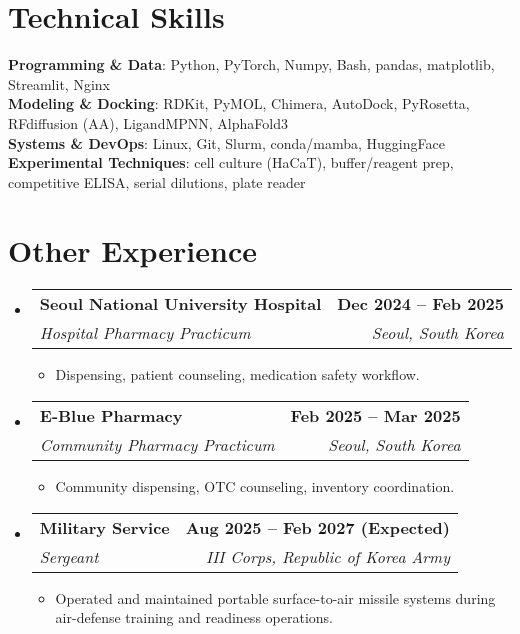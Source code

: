 \documentclass[letterpaper,11pt]{article}
\makeatletter
\newcommand{\resumeItem}[1]{
  \item\small{
    {#1 \vspace{-2pt}}
  }
}
\newcommand{\resumeSubheading}[4]{
  \vspace{-2pt}\item
    \begin{tabular*}{1.0\textwidth}[t]{l@{\extracolsep{\fill}}r}
      \textbf{#1} & \textbf{\small #2} \\
      \textit{\small#3} & \textit{\small #4} \\
    \end{tabular*}\vspace{-7pt}
}
\newcommand{\resumeSubHeadingListStart}{\begin{itemize}[leftmargin=0.0in, label={}]}
\newcommand{\resumeSubHeadingListEnd}{\end{itemize}}
\newcommand{\resumeItemListStart}{\begin{itemize}[leftmargin=0.2in]}
\newcommand{\resumeItemListEnd}{\end{itemize}\vspace{-5pt}}
\makeatother
\begin{document}
\section{Technical Skills}
 \begin{itemize}[leftmargin=0.15in, label={}]
    \small{\item{
    \textbf{Programming \& Data}: Python, PyTorch, Numpy, Bash, pandas, matplotlib, Streamlit, Nginx \\
    \textbf{Modeling \& Docking}: RDKit, PyMOL, Chimera, AutoDock, PyRosetta, RFdiffusion (AA), LigandMPNN, AlphaFold3 \\
    \textbf{Systems \& DevOps}: Linux, Git, Slurm, conda/mamba, HuggingFace \\
    \textbf{Experimental Techniques}: cell culture (HaCaT), buffer/reagent prep, competitive ELISA, serial dilutions, plate reader

    }}
 \end{itemize}
 \vspace{-16pt}


\section{Other Experience}
  \resumeSubHeadingListStart
    \resumeSubheading
      {Seoul National University Hospital}{Dec 2024 -- Feb 2025}
      {Hospital Pharmacy Practicum}{Seoul, South Korea}
      \resumeItemListStart
        \resumeItem{Dispensing, patient counseling, medication safety workflow.}
      \resumeItemListEnd
    \resumeSubheading
      {E-Blue Pharmacy}{Feb 2025 -- Mar 2025}
      {Community Pharmacy Practicum}{Seoul, South Korea}
      \resumeItemListStart
        \resumeItem{Community dispensing, OTC counseling, inventory coordination.}
      \resumeItemListEnd
    \resumeSubheading
      {Military Service}{Aug 2025 -- Feb 2027 (Expected)}
      {Sergeant}{III Corps, Republic of Korea Army}
      \resumeItemListStart
        \resumeItem{Operated and maintained portable surface-to-air missile systems during air-defense training and readiness operations.}
      \resumeItemListEnd
  \resumeSubHeadingListEnd
\end{document}
